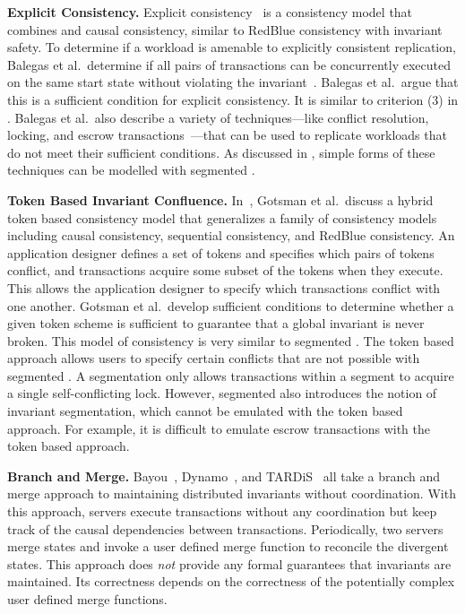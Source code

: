 \textbf{Explicit Consistency.}
Explicit consistency~\cite{balegas2015towards} is a consistency model that
combines \invariantconfluence{} and causal consistency, similar to RedBlue
consistency with invariant safety. To determine if a workload is amenable to
explicitly consistent replication, Balegas et al.\ determine if all pairs of
transactions can be concurrently executed on the same start state without
violating the invariant~\cite{balegas2015towards}. Balegas et al.\ argue that
this is a sufficient condition for explicit consistency. It is similar to
criterion (3) in . Balegas et al.\ also describe a
variety of techniques---like conflict resolution, locking, and escrow
transactions~\cite{o1986escrow}---that can be used to replicate workloads that
do not meet their sufficient conditions. As discussed in ,
simple forms of these techniques can be modelled with segmented
\invariantconfluence{}.

\textbf{Token Based Invariant Confluence.}
In~\cite{gotsman2016cause}, Gotsman et al.\ discuss a hybrid token based
consistency model that generalizes a family of consistency models including
causal consistency, sequential consistency, and RedBlue consistency. An
application designer defines a set of tokens and specifies which pairs of
tokens conflict, and transactions acquire some subset of the tokens when they
execute. This allows the application designer to specify which transactions
conflict with one another.  Gotsman et al.\ develop sufficient conditions to
determine whether a given token scheme is sufficient to guarantee that a global
invariant is never broken. This model of consistency is very similar to
segmented \invariantconfluence{}. The token based approach allows users to
specify certain conflicts that are not possible with segmented
\invariantconfluence{}. A segmentation only allows transactions within a
segment to acquire a single self-conflicting lock. However, segmented
\invariantconfluence{} also introduces the notion of invariant segmentation,
which cannot be emulated with the token based approach. For example, it is
difficult to emulate escrow transactions with the token based approach.

\textbf{Branch and Merge.}
Bayou~\cite{terry1995managing}, Dynamo~\cite{decandia2007dynamo}, and
TARDiS~\cite{crooks2016tardis} all take a branch and merge approach to
maintaining distributed invariants without coordination. With this approach,
servers execute transactions without any coordination but keep track of the
causal dependencies between transactions. Periodically, two servers merge
states and invoke a user defined merge function to reconcile the divergent
states. This approach does \emph{not} provide any formal guarantees that
invariants are maintained. Its correctness depends on the correctness of the
potentially complex user defined merge functions.

